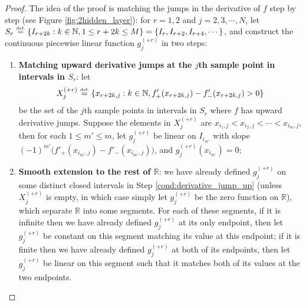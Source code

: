 \documentclass{article}
\numberwithin{equation}{section}
\theoremstyle{definition}
\newcommand{\eqdef}{\ensuremath{\stackrel{\mbox{\upshape\tiny def.}}{=}}}
\begin{document}
\begin{proof}
The idea of the proof is matching the jumps in the derivative of $f$ step by step (see Figure \ref{fig:2hidden_layer}): for $r=1,2$ and $j=2,3,\cdots,N$, let $S_r \eqdef \{ I_{r+2k}: k\in\mathbb{N}, 1 \le r+2k \le M \} = \{I_r,I_{r+2},I_{r+4},\cdots\}$, and construct the continuous piecewise linear function $g_j^{(+r)}$ in two steps: 
\begin{enumerate}
    \item \label{cond:derivative_jump_up} \textbf{Matching upward derivative jumps at the $j$th sample point in intervals in $S_r$}: let
    \[
        X_j^{(+r)} 
        \eqdef 
        \{
            x_{r+2k,j}:
            k\in\mathbb{N},
            f'_+(x_{r+2k,j}) - f'_-(x_{r+2k,j}) > 0
        \}
    \]
    be the set of the $j$th sample points in intervals in $S_r$ where $f$ has upward derivative jumps. Suppose the elements in $X_j^{(+r)}$ are $x_{i_1,j} < x_{i_2,j} < \cdots < x_{i_m,j}$, then for each $1\le m'\le m$, let $g_j^{(+r)}$ be linear on $I_{i_{m'}}$ with slope $(-1)^{m'} \big( f'_+(x_{i_{m'},j}) - f'_-(x_{i_{m'},j}) \big)$, and $g_j^{(+r)}(x_{i_{m'}}) = 0$;
    \item \label{cond:smooth_extension} \textbf{Smooth extension to the rest of $\mathbb{R}$}: we have already defined $g_j^{(+r)}$ on some distinct closed intervals in Step \ref{cond:derivative_jump_up} (unless $X_j^{(+r)}$ is empty, in which case simply let $g_j^{(+r)}$ be the zero function on $\mathbb{R}$), which separate $\mathbb{R}$ into some segments. For each of these segments, if it is infinite then we have already defined $g_j^{(+r)}$ at its only endpoint, then let $g_j^{(+r)}$ be constant on this segment matching its value at this endpoint; if it is finite then we have already defined $g_j^{(+r)}$ at both of its endpoints, then let $g_j^{(+r)}$ be linear on this segment such that it matches both of its values at the two endpoints.
\end{enumerate}


\end{proof}
\end{document}
